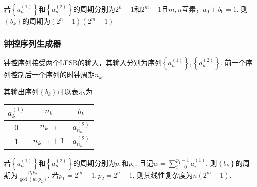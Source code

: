 \documentclass[UTF8]{ctexrep}
\newcommand{\ext}{\displaystyle}
\def\pth#1{\left( {#1}\right)}
\def\brace#1{\left\{ {#1} \right\}}
\begin{document}
若$\brace{a_n^{(1)}}$和$\brace{a_n^{(2)}}$的周期分别为$2^n-1$和$2^m-1$且$m, n$互素，$a_0+b_0=1$, 则$\brace{b_k}$的周期为$\pth{2^n-1}\pth{2^m-1}$
\subsubsection{钟控序列生成器}
钟控序列接受两个LFSR的输入，其输入分别为序列$\brace{a_n^{(1)}}, \brace{a_n^{(2)}}$. 前一个序列控制后一个序列的时钟周期$n_k$.\par
其输出序列$\brace{b_k}$可以表示为
\begin{table}[H]
    \centering
    \begin{tabular}{c|c|c}\hline
        $a_k^{(1)}$&$n_k$&$b_k$\\\hline
        $0$&$n_{k-1}$&$a_{n_k}^{(2)}$\\\hline
        $1$&$n_{k-1}+1$&$a_{n_k}^{(2)}$\\\hline
    \end{tabular}
\end{table}

若$\brace{a_n^{(1)}}$和$\brace{a_n^{(2)}}$的周期分别为$p_1$和$p_2$, 且记$\ext w=\sum_{i=0}^{p_1-1}a_i^{(1)}$, 则$\brace{b_k}$的周期为$\ext\frac{p_1p_2}{\gcd\pth{w, p_2}}$. 若$p_1=2^m-1, p_2=2^n-1$, 则其线性复杂度为$n\pth{2^m-1}$.
\end{document}
